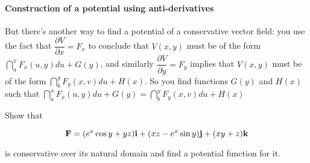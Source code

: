  
\paragraph{Construction of a potential using anti-derivatives}

 But there's another way to find a potential of a conservative vector field: you use the fact that $\dfrac{\partial V}{\partial x} = F_x$ to conclude that $V(x,y)$ must be of the form $\dint_a^x F_x(u,y) du + G(y)$, and similarly $\dfrac{\partial V}{\partial y} = F_y$ implies that $V(x,y)$ must be of the form $\dint_b^y F_y(x,v) du + H(x)$.  So you find functions $G(y)$ and $H(x)$ such that $\dint_a^x F_x(u,y) du + G(y) = \dint_b^y F_y(x,v) du + H(x)$

 
\begin{exa}
  Show that 

\[\mathbf{ F}=(e^x \cos y+yz)\mathbf{ i}+(xz-e^x\sin y)\mathbf{ j}+(xy+z)\mathbf{ k}\]

is conservative over its natural domain and find a potential function for it.

\end{exa}


